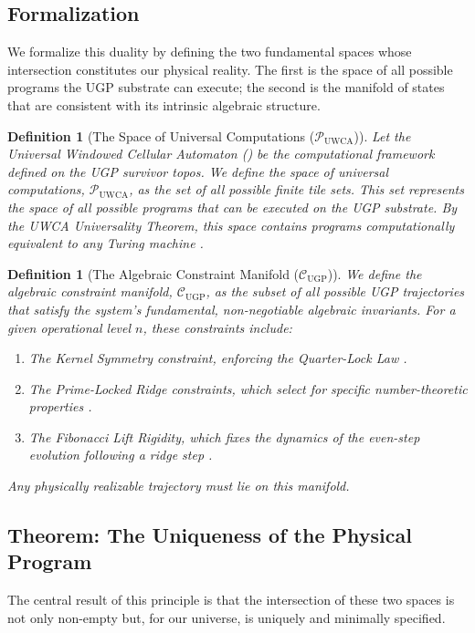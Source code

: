 \documentclass[12pt]{article}
\newtheorem{definition}[theorem]{Definition}
\newcommand{\UGP}{\text{UGP}}
\newcommand{\UWCA}{\text{UWCA}}
\newcommand{\scP}{\mathscr{P}}
\newcommand{\scC}{\mathscr{C}}
\begin{document}
\subsection{Formalization}
We formalize this duality by defining the two fundamental spaces whose intersection constitutes our physical reality. The first is the space of all possible programs the UGP substrate can execute; the second is the manifold of states that are consistent with its intrinsic algebraic structure.

\begin{definition}[The Space of Universal Computations ($\scP_{\UWCA}$)]
\label{def:space_of_computations}
Let the Universal Windowed Cellular Automaton (\UWCA) be the computational framework defined on the UGP survivor topos. We define the space of universal computations, $\scP_{\UWCA}$, as the set of all possible finite \UWCA tile sets. This set represents the space of all possible programs that can be executed on the UGP substrate. By the UWCA Universality Theorem, this space contains programs computationally equivalent to any Turing machine \cite{Spivack2025UGP}.
\end{definition}

\begin{definition}[The Algebraic Constraint Manifold ($\scC_{\UGP}$)]
\label{def:constraint_manifold}
We define the algebraic constraint manifold, $\scC_{\UGP}$, as the subset of all possible UGP trajectories that satisfy the system's fundamental, non-negotiable algebraic invariants. For a given operational level $n$, these constraints include:
\begin{enumerate}[label=(\roman*)]
    \item The Kernel Symmetry constraint, enforcing the Quarter-Lock Law \cite{Spivack2025UGP}.
    \item The Prime-Locked Ridge constraints, which select for specific number-theoretic properties \cite{Spivack2025UGP}.
    \item The Fibonacci Lift Rigidity, which fixes the dynamics of the even-step evolution following a ridge step \cite{Spivack2025UGP}.
\end{enumerate}
Any physically realizable trajectory must lie on this manifold.
\end{definition}

\subsection{Theorem: The Uniqueness of the Physical Program}
The central result of this principle is that the intersection of these two spaces is not only non-empty but, for our universe, is uniquely and minimally specified.
\end{document}
